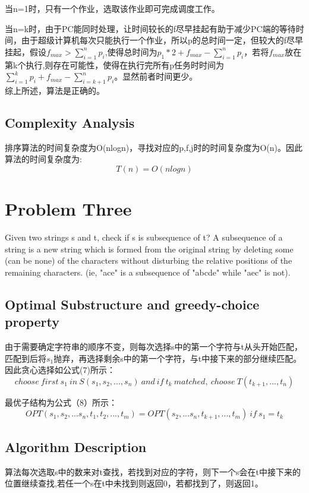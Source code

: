 \documentclass{article}
\begin{document}
\begin{CJK*}{UTF8}{gbsn}
当n=1时，只有一个作业，选取该作业即可完成调度工作。

当n=k时，由于PC能同时处理，让时间较长的f尽早挂起有助于减少PC端的等待时间，由于超级计算机每次只能执行一个作业，所以p的总时间一定，但较大的f尽早挂起，假设$f_{max}> \sum_{i=1}^np_i$,使得总时间为$p_1\ast2 + f_{max} - \sum_{i=1}^np_i$，若将$f_{max}$放在第k个执行,则存在可能性，使得在执行完所有p任务时时间为$\sum_{i=1}^kp_i + f_{max} - \sum_{i=k+1}^np_i$。显然前者时间更少。\\

综上所述，算法是正确的。

\subsection{Complexity Analysis}
排序算法的时间复杂度为O(nlogn)，寻找对应的p,f,j时的时间复杂度为O(n)。因此算法的时间复杂度为:
\begin{equation}
T(n) = O(nlogn)
\end{equation}


\newpage
\section{Problem Three}
Given two strings s and t, check if s is subsequence of t? A subsequence of a string is a new string which is formed from the original string by deleting some (can be none) of the characters without disturbing the relative positions of the remaining characters. (ie, "ace" is a subsequence of "abcde" while "aec" is not).


\subsection{Optimal Substructure and greedy-choice property}
由于需要确定字符串的顺序不变，则每次选择s中的第一个字符与t从头开始匹配，匹配到后将$s_1$抛弃，再选择剩余s中的第一个字符，与t中接下来的部分继续匹配。因此贪心选择如公式(7)所示：
\begin{equation}
choose\ first\ s_1\ in\ S(s_1,s_2,...,s_n)\ and\ if\ t_k\ matched,\ choose\ T(t_{k+1},...,t_n)
\end{equation}

最优子结构为公式（8）所示：
\begin{equation}
OPT(s_1,s_2,...s_n,t_1,t_2,...,t_m) = OPT(s_2,...s_n,t_{k+1},...,t_m)\ if\ s_1 = t_k
\end{equation} 
 

\subsection{Algorithm Description}
算法每次选取s中的数来对t查找，若找到对应的字符，则下一个s会在t中接下来的位置继续查找,若任一个s在t中未找到则返回0，若都找到了，则返回1。



\end{CJK*}
\end{document}
